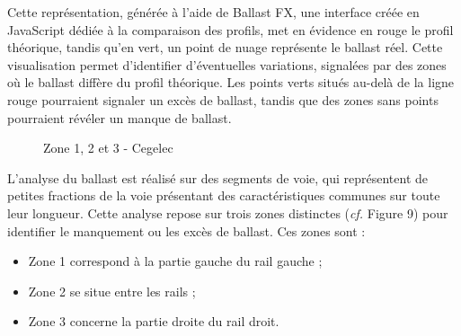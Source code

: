 Cette représentation, générée à l'aide de Ballast FX, une interface créée en JavaScript dédiée à la comparaison des profils, met en évidence en rouge le profil théorique, tandis qu'en vert, un point de nuage représente le ballast réel. Cette visualisation permet d'identifier d'éventuelles variations, signalées par des zones où le ballast diffère du profil théorique. Les points verts situés au-delà de la ligne rouge pourraient signaler un excès de ballast, tandis que des zones sans points pourraient révéler un manque de ballast. \\

    \begin{figure}[H]
            \centering

            \caption{Zone 1, 2 et 3 - Cegelec \cite{RHEA}} 
        \end{figure}
    


L'analyse du ballast est réalisé sur des segments de voie, qui représentent de petites fractions de la voie présentant des caractéristiques communes sur toute leur longueur. Cette analyse repose sur trois zones distinctes (\textit{cf.} Figure 9) pour identifier le manquement ou les excès de ballast. Ces zones sont : 


\begin{itemize}
    \item Zone 1 correspond à la partie gauche du rail gauche ;
    \item Zone 2 se situe entre les rails ;
    \item Zone 3 concerne la partie droite du rail droit.
\end{itemize}

